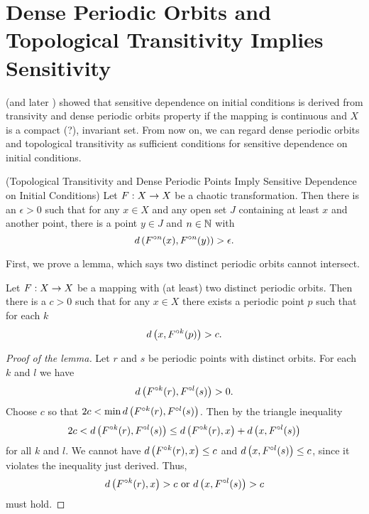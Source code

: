\documentclass[12pt,draft,twoside]{book}
\begin{document}
\section{Dense Periodic Orbits and Topological Transitivity Implies Sensitivity}
\citet{silverman} (and later \citet{banks}) showed that sensitive dependence on initial conditions is derived from transivity and dense periodic orbits property if the mapping is continuous and $X$ is a compact (?), invariant set. 
From now on, we can regard dense periodic orbits and topological transitivity as sufficient conditions for sensitive dependence on initial conditions.

\begin{theorem}
  (Topological Transitivity and Dense Periodic Points Imply Sensitive Dependence on Initial Conditions)
  Let $F: X\rightarrow X$ be a chaotic transformation. Then there is an $\epsilon > 0$ such that
  for any $x\in X$ and any open set $J$ containing at least $x$ and another point, there is
  a point $y\in J$ and $n\in \mathbb{N}$ with
  \begin{equation*}
    d\left( F^{\circ n}(x),F^{\circ n}(y) \right) > \epsilon.
  \end{equation*}
  \label{thm:banks}
\end{theorem}
First, we prove a lemma, which says two distinct periodic orbits cannot intersect.
\begin{lemma}
  Let $F: X\rightarrow X$ be a mapping with (at least) two distinct periodic orbits.
  Then there is a $c > 0$ such that for any $x\in X$ there exists a periodic
  point $p$ such that for each $k$
  \begin{equation*}
    d\left( x, F^{\circ k}(p) \right) > c.
  \end{equation*}
  \label{lem:dev1}
  \begin{proof}[Proof of the lemma]
    Let $r$ and $s$ be periodic points with distinct orbits. For each $k$ and $l$ we have
    \begin{equation*}
      d\left( F^{\circ k}(r), F^{\circ l}(s) \right) > 0.
    \end{equation*}
    Choose $c$ so that $2c < \min d\left( F^{\circ k}(r),F^{\circ l}(s) \right)$.
    Then by the triangle inequality
    \begin{equation*}
      2c < d\left( F^{\circ k}(r),F^{\circ l}(s) \right) \leq d\left( F^{\circ k}(r),x \right) + d\left( x,F^{\circ l}(s) \right)
    \end{equation*}
    for all $k$ and $l$.
    We cannot have $d\left( F^{\circ k}(r),x \right) \leq c$ and $d\left( x,F^{\circ l}(s) \right) \leq c$, since it violates the inequality just derived.
    Thus,
    \begin{equation*}
      d\left( F^{\circ k}(r),x \right) > c \mbox{ or } d\left( x,F^{\circ l}(s) \right) > c
    \end{equation*}
    must hold.
  \end{proof}
\end{lemma}
\end{document}
